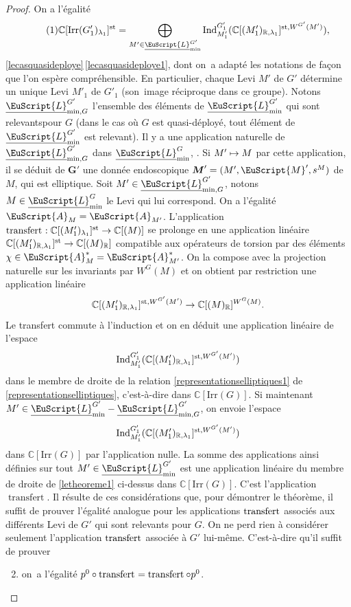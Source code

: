 \documentclass[JEP,XML,SOM,Unicode,francais]{cedram}
\let\mathcal \EuScript
\newcommand{\NoChangel}[1]{%
\expandafter\let\csname old\string#1\endcsname=#1
\let#1=\relax
\newcommand{#1}{\mathcode`l="716C\csname old\string#1\endcsname\mathcode`l="7160 }%
}
\newcommand\mto{\mathchoice{\longmapsto}{\mapsto}{\mapsto}{\mapsto}}
\newcommand{\rell}{\mathrm{ell}} \NoChangel{\rell}
\newcommand{\Ell}{\mathrm{Ell}} \NoChangel{\Ell}
\newcommand{\Ind}{\mathrm{Ind}}
\newcommand{\Irr}{\mathrm{Irr}}
\newcommand{\trel}{\textup{-rel}} \NoChangel{\trel}
\newcommand{\st}{\mathrm{st}}
\DeclareMathOperator{\transfert}{transfert}
\newcommand{\bG}{\boldsymbol{G}}
\newcommand{\bM}{\boldsymbol{M}}
\newcommand{\cA}{\mathcal{A}}
\newcommand{\cL}{\mathcal{L}}
\newcommand{\cM}{\mathcal{M}}
\newcommand{\CC}{\mathbb{C}}
\newcommand{\RR}{\mathbb{R}}
\theoremstyle{plain}
\theoremstyle{definition}
\begin{document}
\begin{proof}
On a l'égalité
\begin{equation}\tag{1}\label{letheoreme1}
\CC[\Irr(G'_{1})_{\lambda_{1}}]^{\st}=\bigoplus_{M'\in \underline{\cL}_{\min}^{G'}}\Ind_{M'_{1}}^{G'_{1}}(\CC[\Ell(M'_{1})_{\RR,\lambda_{1}}]^{\st,W^{G'}(M')}),
\end{equation}
\cf \ref{lecasquasideploye}\,\eqref{lecasquasideploye1}, dont on~a adapté les notations de façon que l'on espère compréhensible. En particulier, chaque Levi $M'$ de $G'$ détermine un unique Levi $M'_{1}$ de $G'_{1}$ (son~image réciproque dans ce groupe). Notons $\underline{\cL}_{\min,G\trel}^{G'}$ l'ensemble des éléments de $\underline{\cL}_{\min}^{G'}$ qui sont \og relevants\fg pour $G$ (dans le cas où $G$ est quasi-déployé, tout élément de $\underline{\cL}_{\min}^{G'}$ est relevant). Il y a une application naturelle
de $\underline{\cL}_{\min,G\trel}^{G'}$ dans $\underline{\cL} _{\min}^G$, \cf \hbox{\cite[1.3.4]{MW}}. Si $M'\mto M$ par cette application, il se déduit de $\bG'$ une donnée endoscopique $\bM'=(M',\cM',s^M)$ de $M$, qui est elliptique.
Soit $M'\in \underline{\cL}_{\min,G\trel}^{G'}$, notons $M\in \underline{\cL} _{\min}^G$ le Levi qui lui correspond. On a l'égalité $\cA_{M}=\cA_{M'}$. L'application $\transfert_{\rell}: \CC[\Ell(M'_{1})_{\lambda_{1}}]^{\st}\to \CC[\Ell(M)]$ se prolonge en une application linéaire
$\CC[\Ell(M'_{1})_{\RR,\lambda_{1}}]^{\st}\to \CC[\Ell(M)_{\RR}]$ compatible aux opérateurs de torsion par des éléments $\chi\in \cA_{M}^*=\cA_{M'}^*$. On la compose avec la projection naturelle sur les invariants par $W^G(M)$ et on obtient par restriction une application linéaire
\[
\CC[\Ell(M'_{1})_{\RR,\lambda_{1}}]^{\st,W^{G'}(M')}\to \CC[\Ell(M)_{\RR}]^{W^G(M)}.
\]
Le transfert commute à l'induction et on en déduit une application linéaire de l'espace
\[
\Ind_{M'_{1}}^{G'_{1}}(\CC[\Ell(M'_{1})_{\RR,\lambda_{1}}]^{\st,W^{G'}(M')})
\]
dans le membre de droite de la relation \eqref{representationselliptiques1} de \ref{representationselliptiques}, c'est-à-dire dans $ \CC[\Irr(G)]$. Si maintenant $M'\in \underline{\cL}_{\min}^{G'}-\underline{\cL}_{\min,G\trel}^{G'}$, on envoie l'espace
\[
\Ind_{M'_{1}}^{G'_{1}}(\CC[\Ell(M'_{1})_{\RR,\lambda_{1}}]^{\st,W^{G'}(M')})
\]
dans $ \CC[\Irr(G)]$ par l'application nulle. La somme des applications ainsi définies sur tout $M'\in \underline{\cL}_{\min}^{G'}$ est une application linéaire du membre de droite de \eqref{letheoreme1} ci-dessus dans $ \CC[\Irr(G)]$. C'est
l'application $\transfert$. Il résulte de ces considérations que, pour démontrer le théorème, il suffit de prouver l'égalité analogue pour les applications $\transfert_{\rell}$ associés aux différents Levi de $G'$ qui sont relevants pour $G$. On ne perd rien à considérer seulement l'application $\transfert_{\rell}$ associée à $G'$ lui-même. C'est-à-dire qu'il suffit de prouver
\begin{enumerate}\setcounter{enumi}{1}
\item\label{letheoreme2}
on~a l'égalité $p^0\circ \transfert_{\rell}=\transfert_{\rell}\circ p^0$.
\end{enumerate}


\end{proof}
\end{document}
